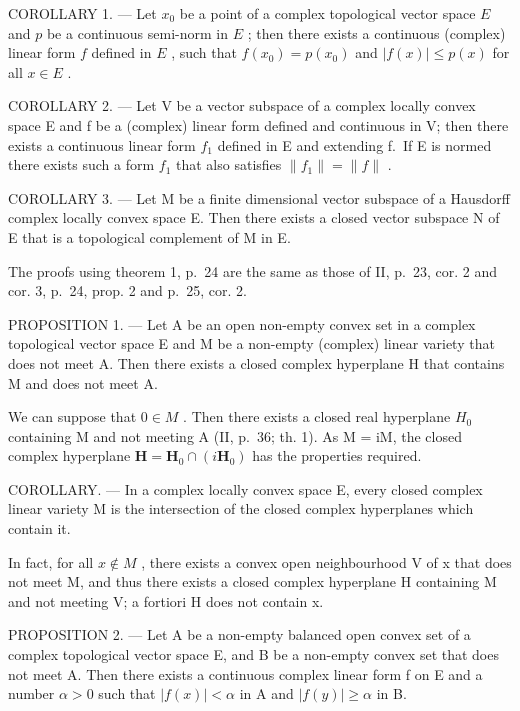 COROLLARY 1. --- Let \(x_0\) be a point of a complex topological vector space \(E\) and \(p\) be a continuous semi-norm in \(E\) ; then there exists a continuous (complex) linear form \(f\) defined in \(E\) , such that \(f(x_0) = p(x_0)\) and \(|f(x)| \leqslant p(x)\) for all \(x \in E\) .

COROLLARY 2. --- Let V be a vector subspace of a complex locally convex space E and f be a (complex) linear form defined and continuous in V; then there exists a continuous linear form \(f_{1}\) defined in E and extending f.~If E is normed there exists such a form \(f_{1}\) that also satisfies \(\|f_{1}\|=\|f\|\) .

COROLLARY 3. --- Let M be a finite dimensional vector subspace of a Hausdorff complex locally convex space E. Then there exists a closed vector subspace N of E that is a topological complement of M in E.

The proofs using theorem 1, p.~24 are the same as those of II, p.~23, cor. 2 and cor. 3, p.~24, prop. 2 and p.~25, cor. 2.

PROPOSITION 1. --- Let A be an open non-empty convex set in a complex topological vector space E and M be a non-empty (complex) linear variety that does not meet A. Then there exists a closed complex hyperplane H that contains M and does not meet A.

We can suppose that \(0 \in M\) . Then there exists a closed real hyperplane \(H_{0}\) containing M and not meeting A (II, p.~36; th. 1). As M = iM, the closed complex hyperplane \(\mathbf{H} = \mathbf{H}_{0} \cap (i\mathbf{H}_{0})\) has the properties required.

COROLLARY. --- In a complex locally convex space E, every closed complex linear variety M is the intersection of the closed complex hyperplanes which contain it.

In fact, for all \(x \notin M\) , there exists a convex open neighbourhood V of x that does not meet M, and thus there exists a closed complex hyperplane H containing M and not meeting V; a fortiori H does not contain x.

PROPOSITION 2. --- Let A be a non-empty balanced open convex set of a complex topological vector space E, and B be a non-empty convex set that does not meet A. Then there exists a continuous complex linear form f on E and a number \(\alpha > 0\) such that \(|f(x)| < \alpha\) in A and \(|f(y)| \geqslant \alpha\) in B.

